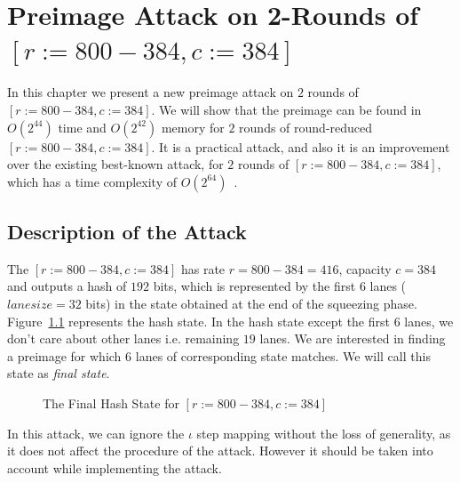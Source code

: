 \chapter{Preimage Attack on 2-Rounds of \KECCAK{}${[r:=800-384, c:=384]}$}

In this chapter we present a new preimage attack on $2$ rounds of \KECCAK{}$[r:=800-384, c:=384]$. We will show that the preimage can be found in $O(2^{44})$ time and $O(2^{42})$ memory for $2$ rounds of round-reduced \KECCAK{}$[r:=800-384, c:=384]$. It is a practical attack, and also it is an improvement over the existing best-known attack, for $2$ rounds of \KECCAK{}$[r:=800-384, c:=384]$, which has a time complexity of $O(2^{64})$~\cite{guo2016linear}.

\section{Description of the Attack}
\label{2rkeccak800attack}
The \KECCAK{}$[r:=800-384, c:=384]$ has rate $r = 800-384 = 416$, capacity $c = 384$ and outputs a hash of $192$ bits, which is represented by the first $6$ lanes ($lanesize = 32$ bits) in the state obtained at the end of the squeezing phase. Figure~\ref{initial_sq} represents the hash state. In the hash state except the first $6$ lanes, we don't care about other lanes i.e. remaining $19$ lanes. We are interested in finding a preimage for which $6$ lanes of corresponding state matches. We will call this state as \emph{final state}.
\begin{figure}[ht]
\begin{center}
\end{center}
\caption{The Final Hash State for \KECCAK{}$[r:=800-384, c:=384]$ \label{initial_sq}}
\end{figure}
In this attack, we can ignore the {$\iota$} step mapping without the loss of generality, as it does not affect the procedure of the attack. However it should be taken into account while implementing the attack.

